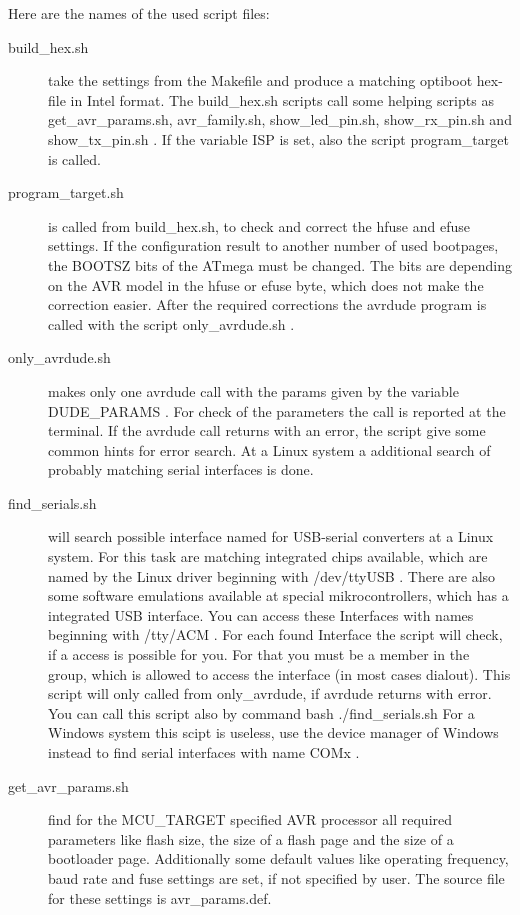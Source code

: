 Here are the names of the used script files:
\begin{description}

\item [build\_hex.sh] take the settings from the Makefile and produce a
matching optiboot hex-file in Intel format.
The build\_hex.sh scripts call some helping scripts as get\_avr\_params.sh,
avr\_family.sh, show\_led\_pin.sh, show\_rx\_pin.sh and show\_tx\_pin.sh .
If the variable ISP is set, also the script program\_target is called.

\item [program\_target.sh] is called from build\_hex.sh, to check and correct
the hfuse and efuse settings. 
If the configuration result to another number of used bootpages, the BOOTSZ bits
of the ATmega must be changed. The bits are depending on the AVR model
in the hfuse or efuse byte, which does not make the correction easier.
After the required corrections the avrdude program is called with
the script only\_avrdude.sh .

\item [only\_avrdude.sh] makes only one avrdude call with the params
given by the variable DUDE\_PARAMS .
For check of the parameters the call is reported at the terminal.
If the avrdude call returns with an error, the script give some common hints
for error search. At a Linux system a additional search of probably matching serial
interfaces is done.

\item [find\_serials.sh] will search possible interface named for USB-serial converters
at a Linux system.
For this task are matching integrated chips available, which are named by the
Linux driver beginning with /dev/ttyUSB .
There are also some software emulations available at special mikrocontrollers,
which has a integrated USB interface. You can access these Interfaces with
names beginning with /tty/ACM .
For each found Interface the script will check, if a access is possible for you.
For that you must be a member in the group, which is allowed to access the
interface (in most cases dialout).
This script will only called from only\_avrdude, if avrdude returns with error.
You can call this script also by command bash ./find\_serials.sh
For a Windows system this scipt is useless, use the device manager of Windows instead
to find serial interfaces with name COMx .

\item [get\_avr\_params.sh] find for the MCU\_TARGET specified AVR processor
 all required parameters like flash size, the size of a flash page and the
size of a bootloader page. Additionally some default values like operating frequency,
baud rate and fuse settings are set, if not specified by user.
The source file for these settings is avr\_params.def.


\end{description}
